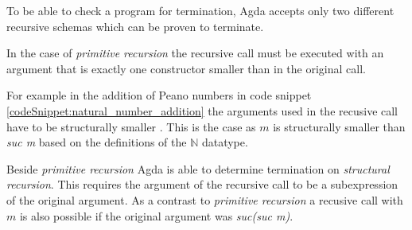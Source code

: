To be able to check a program for termination, Agda accepts only two different recursive schemas which can be proven to terminate.

In the case of \emph{primitive recursion} the recursive call must be executed with an argument that is exactly one constructor smaller than in the original call.

For example in the addition of Peano numbers in code snippet \ref{codeSnippet:natural_number_addition} the arguments used in the recusive call have to be structurally smaller \cite{norell:deptyped}. 
This is the case as $m$ is structurally smaller than \emph{suc m} based on the definitions of the $\mathbb{N}$ datatype.

Beside \emph{primitive recursion} Agda is able to determine termination on \emph{structural recursion}.
This requires the argument of the recursive call to be a subexpression of the original argument.
As a contrast to \emph{primitive recursion} a recusive call with $m$ is also possible if the original argument was \emph{suc(suc m)}.